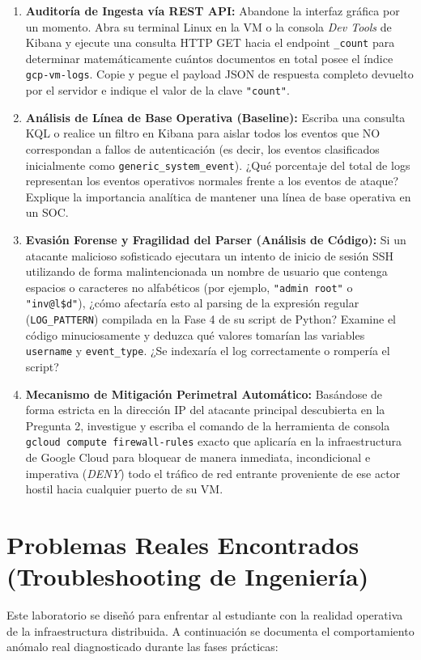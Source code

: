 \documentclass[
  coursetitle={Cómputo Nube y Tecnologías Emergentes},
  coursehours={96},
  coursedate={Verano 2026},
  doctype={Práctica},
  otherlangs={english,french},
  authorname={Lázaro},
  authorsurname={Bustio-Martínez},
  authortitle={PhD},
  role={Profesor Investigador},
  email={lbustio@inaoe.mx},
  phone={5559504000},
  ext={7459},
  institution={Instituto Nacional de Astrofísica, Óptica y Electrónica (INAOE)},
  department={Maestría en Ciencias en Tecnologías de Seguridad},
  address={Luis Enrique Erro 1, Sta. Ma. Tonantzintla, San Andrés Cholula, CP 72840, Puebla, México},
  margin={0.5in}
]{../../lbustio_lecture_notes}
\begin{document}
\begin{enumerate}
    \item \textbf{Auditoría de Ingesta vía REST API:} Abandone la interfaz gráfica por un momento. Abra su terminal Linux en la VM o la consola \textit{Dev Tools} de Kibana y ejecute una consulta HTTP GET hacia el endpoint \texttt{\_count} para determinar matemáticamente cuántos documentos en total posee el índice \texttt{gcp-vm-logs}. Copie y pegue el payload JSON de respuesta completo devuelto por el servidor e indique el valor de la clave \texttt{"count"}.
    
    \item \textbf{Análisis de Línea de Base Operativa (Baseline):} Escriba una consulta KQL o realice un filtro en Kibana para aislar todos los eventos que NO correspondan a fallos de autenticación (es decir, los eventos clasificados inicialmente como \texttt{generic\_system\_event}). ¿Qué porcentaje del total de logs representan los eventos operativos normales frente a los eventos de ataque? Explique la importancia analítica de mantener una línea de base operativa en un SOC.
    
    \item \textbf{Evasión Forense y Fragilidad del Parser (Análisis de Código):} Si un atacante malicioso sofisticado ejecutara un intento de inicio de sesión SSH utilizando de forma malintencionada un nombre de usuario que contenga espacios o caracteres no alfabéticos (por ejemplo, \texttt{"admin root"} o \texttt{"inv@l\$d"}), ¿cómo afectaría esto al parsing de la expresión regular (\texttt{LOG\_PATTERN}) compilada en la Fase 4 de su script de Python? Examine el código minuciosamente y deduzca qué valores tomarían las variables \texttt{username} y \texttt{event\_type}. ¿Se indexaría el log correctamente o rompería el script?
    
    \item \textbf{Mecanismo de Mitigación Perimetral Automático:} Basándose de forma estricta en la dirección IP del atacante principal descubierta en la Pregunta 2, investigue y escriba el comando de la herramienta de consola \texttt{gcloud compute firewall-rules} exacto que aplicaría en la infraestructura de Google Cloud para bloquear de manera inmediata, incondicional e imperativa (\textit{DENY}) todo el tráfico de red entrante proveniente de ese actor hostil hacia cualquier puerto de su VM.
\end{enumerate}

\section{Problemas Reales Encontrados (Troubleshooting de Ingeniería)}
Este laboratorio se diseñó para enfrentar al estudiante con la realidad operativa de la infraestructura distribuida. A continuación se documenta el comportamiento anómalo real diagnosticado durante las fases prácticas:
\end{document}

